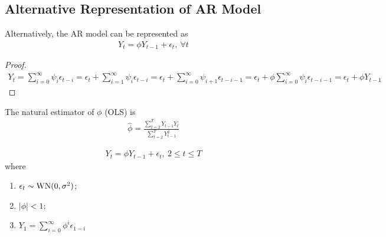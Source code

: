\documentclass[11pt]{elegantbook}
\begin{document}
\subsection{Alternative Representation of AR Model}
\begin{definition}
    Alternatively, the AR model can be represented as
    \begin{equation}
        \begin{aligned}
            Y_t=\phi Y_{t-1}+\epsilon_t,\ \forall t
        \end{aligned}
        \nonumber
    \end{equation}
\end{definition}
\begin{proof}
    \begin{equation}
        \begin{aligned}
            Y_{t}=\sum_{i=0}^\infty \psi_i\epsilon_{t-i}=\epsilon_t+\sum_{i=1}^\infty \psi_i\epsilon_{t-i}=\epsilon_t+\sum_{i=0}^\infty \psi_{i+1}\epsilon_{t-i-1}=\epsilon_t+\phi\sum_{i=0}^\infty \psi_{i}\epsilon_{t-i-1}=\epsilon_t+\phi Y_{t-1}
        \end{aligned}
        \nonumber
    \end{equation}
\end{proof}

The natural estimator of $\phi$ (OLS) is
\begin{equation}
    \begin{aligned}
        \hat{\phi}=\frac{\sum_{t=2}^TY_{t-1}Y_t}{\sum_{t=2}^T Y_{t-1}^2}
    \end{aligned}
    \nonumber
\end{equation}



\begin{definition}
    \begin{equation}
        \begin{aligned}
            Y_t=\phi Y_{t-1}+\epsilon_t,\ 2\leq t\leq T
        \end{aligned}
        \nonumber
    \end{equation}
    where
    \begin{enumerate}[$\circ$]
        \item $\epsilon_t\sim \textnormal{WN}(0,\sigma^2)$;
        \item $|\phi|<1$;
        \item $Y_1=\sum_{i=0}^\infty \phi^i\epsilon_{1-i}$
    \end{enumerate}
\end{definition}
\end{document}
